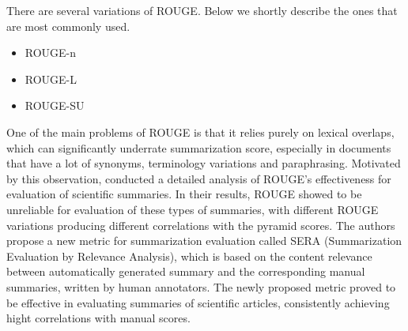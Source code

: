 \documentclass[11pt,a4paper,onecolumn]{article}
\begin{document}
There are several variations of ROUGE. Below we shortly describe the ones that are most commonly used.
\begin{itemize}
\item ROUGE-n
\item ROUGE-L
\item ROUGE-SU
\end{itemize}

One of the main problems of ROUGE is that it relies purely on lexical overlaps, which can significantly underrate summarization score, especially in documents that have a lot of synonyms, terminology variations and paraphrasing.
Motivated by this observation, \cite{cohan2016revisiting} conducted a detailed  analysis of ROUGE’s effectiveness for evaluation of scientific summaries.
In their results, ROUGE showed to be unreliable for evaluation of these types of summaries, with different ROUGE variations producing different correlations with the pyramid scores.
The authors propose a new metric for summarization evaluation called SERA (Summarization Evaluation by Relevance Analysis), which is based on the content relevance between automatically generated summary and the corresponding manual summaries, written by human annotators.
The newly proposed metric proved to be effective in evaluating summaries of scientific articles, consistently achieving hight correlations with manual scores.


%
%



\appendix
\end{document}
